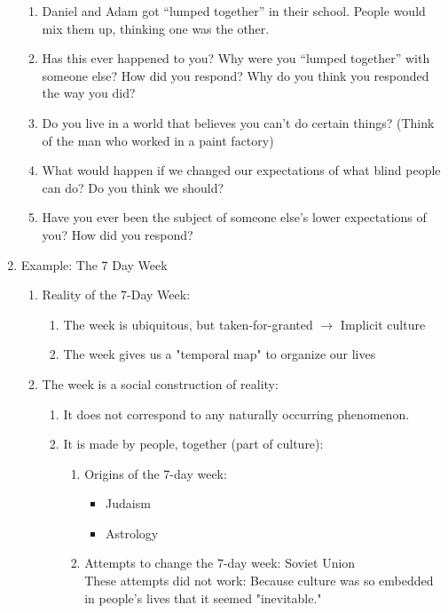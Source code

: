 \documentclass[12pt,a4paper]{article}
\begin{document}
\begin{enumerate}
\begin{eg}{ }
\begin{enumerate}
			\item Daniel and Adam got “lumped together” in their school.  People would mix them up, thinking one was the other.  
			\item Has this ever happened to you?  Why were you “lumped together” with someone else? How did you respond?  Why do you think you responded the way you did?
			\item Do you live in a world that believes you can’t do certain things? (Think of the man who worked in a paint factory)
			\item What would happen if we changed our expectations of what blind people can do?  Do you think we should?
			\item Have you ever been the subject of someone else’s lower expectations of you?  How did you respond?
		\end{enumerate}
	\end{eg}
	\item Example: The 7 Day Week
	\begin{eg}{ }
		\begin{enumerate}
			\item Reality of the 7-Day Week: 
			\begin{enumerate}
				\item The week is ubiquitous, but taken-for-granted 	$\rightarrow$ Implicit culture
				\item The week gives us a "temporal map" to organize our lives
			\end{enumerate}
			\item The week is a social construction of reality: 
			\begin{enumerate}
				\item It does not correspond to any naturally occurring phenomenon.
				\item It is made by people, together (part of culture): 
				\begin{enumerate}
					\item Origins of the 7-day week: 
					\begin{itemize}
						\item Judaism
						\item Astrology	
					\end{itemize}
					\item Attempts to change the 7-day week: Soviet Union\\
					These attempts did not work: Because culture was so embedded in people's lives that it seemed "inevitable."
				\end{enumerate}

\end{enumerate}
\end{enumerate}
\end{eg}
\end{enumerate}
\end{document}
